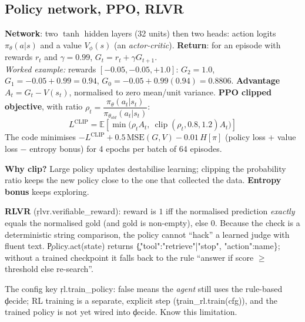 \subsection{Policy network, PPO, RLVR}
\textbf{Network}: two $\tanh$ hidden layers (32 units) then two heads: action logits $\pi_\theta(a|s)$ and a value $V_\phi(s)$ (an \emph{actor-critic}).
\textbf{Return}: for an episode with rewards $r_t$ and $\gamma=0.99$, $G_t=r_t+\gamma G_{t+1}$.\\
\emph{Worked example:} rewards $[-0.05,-0.05,+1.0]$: $G_2=1.0$, $G_1=-0.05+0.99=0.94$, $G_0=-0.05+0.99(0.94)=0.8806$.
\textbf{Advantage} $A_t=G_t-V(s_t)$, normalised to zero mean/unit variance.
\textbf{PPO clipped objective}, with ratio $\rho_t=\dfrac{\pi_\theta(a_t|s_t)}{\pi_{\theta_{old}}(a_t|s_t)}$:
\[ L^{\text{CLIP}}=\mathbb{E}\left[\min\bigl(\rho_tA_t,\ \operatorname{clip}(\rho_t,0.8,1.2)A_t\bigr)\right]\]
The code minimises $-L^{\text{CLIP}}+0.5\,\text{MSE}(G,V)-0.01\,H[\pi]$ (policy loss + value loss $-$ entropy bonus) for 4 epochs per batch of 64 episodes.
\begin{why}\textbf{Why clip?} Large policy updates destabilise learning; clipping the probability ratio keeps the new policy close to the one that collected the data. \textbf{Entropy bonus} keeps exploring.\end{why}
\textbf{RLVR} (\c{rlvr.verifiable\_reward}): reward is $1$ iff the normalised prediction \emph{exactly} equals the normalised gold (and gold is non-empty), else $0$. Because the check is a deterministic string comparison, the policy cannot ``hack'' a learned judge with fluent text. \c{Policy.act(state)} returns \c{\{"tool":"retrieve"|"stop", "action":name\}}; without a trained checkpoint it falls back to the rule ``answer if score $\ge$ threshold else re-search''.
\begin{gotcha}The config key \c{rl.train\_policy: false} means the \emph{agent} still uses the rule-based \c{decide}; RL training is a separate, explicit step (\c{train\_rl.train(cfg)}), and the trained policy is not yet wired into \c{decide}. Know this limitation.\end{gotcha}

